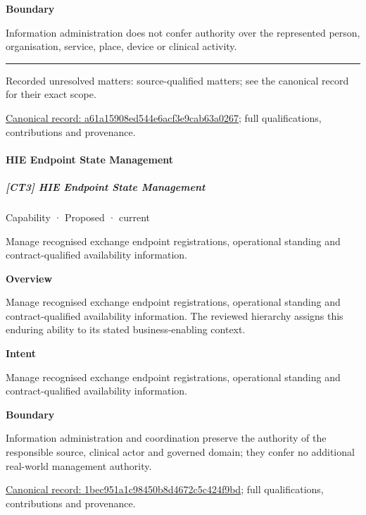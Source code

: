\textbf{Boundary}



Information administration does not confer authority over the represented person, organisation, service, place, device or clinical activity.



\medskip\hrule\medskip

{\small Recorded unresolved matters: source-qualified matters; see the canonical record for their exact scope.}\par
{\footnotesize \href{../../../../continuum/strategy/capability/a61a15908ed544e6acf3e9cab63a0267.md}{Canonical record: a61a15908ed544e6acf3e9cab63a0267}; full qualifications, contributions and provenance.}\par
\paragraph{HIE Endpoint State Management}

\subparagraph{[CT3] HIE Endpoint State Management}

\label{element:1bec951a1c98450b8d4672c5c424f9bd}
{\small Capability · Proposed · current}\par

Manage recognised exchange endpoint registrations, operational standing and contract-qualified availability information.



\textbf{Overview}



Manage recognised exchange endpoint registrations, operational standing and contract-qualified availability information. The reviewed hierarchy assigns this enduring ability to its stated business-enabling context.



\textbf{Intent}



Manage recognised exchange endpoint registrations, operational standing and contract-qualified availability information.



\textbf{Boundary}



Information administration and coordination preserve the authority of the responsible source, clinical actor and governed domain; they confer no additional real-world management authority.


{\footnotesize \href{../../../../continuum/strategy/capability/1bec951a1c98450b8d4672c5c424f9bd.md}{Canonical record: 1bec951a1c98450b8d4672c5c424f9bd}; full qualifications, contributions and provenance.}\par
